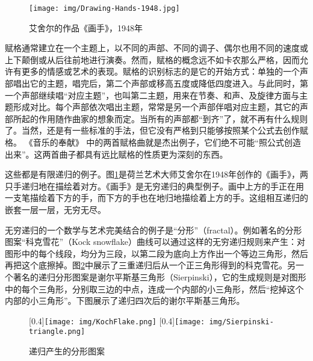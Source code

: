\documentclass[UTF8]{article}
\begin{document}
\begin{figure}[htbp]
 \centering
 \texttt{[image: img/Drawing-Hands-1948.jpg]}
 \caption{艾舍尔的作品《画手》，1948年}
 \label{fig:Drawing-Hands}
\end{figure}

赋格通常建立在一个主题上，以不同的声部、不同的调子、偶尔也用不同的速度或上下颠倒或从后往前地进行演奏。然而，赋格的概念远不如卡农那么严格，因而允许有更多的情感或艺术的表现。赋格的识别标志的是它的开始方式：单独的一个声部唱出它的主题，唱完后，第二个声部或移高五度或降低四度进入。与此同时，第一个声部继续唱“对应主题”，也叫第二主题，用来在节奏、和声、及旋律方面与主题形成对比。每个声部依次唱出主题，常常是另一个声部伴唱对应主题，其它的声部所起的作用随作曲家的想象而定。当所有的声部都“到齐”了，就不再有什么规则了。当然，还是有一些标准的手法，但它没有严格到只能够按照某个公式去创作赋格。 《音乐的奉献》 中的两首赋格曲就是杰出例子，它们绝不可能“照公式创造出来”。这两首曲子都具有远比赋格的性质更为深刻的东西\cite{GEB}。

这些都是有限递归的例子。图\ref{fig:Drawing-Hands}是荷兰艺术大师艾舍尔在1948年创作的《画手》，两只手递归地在描绘着对方。《画手》是无穷递归的典型例子。画中上方的手正在用一支笔描绘着下方的手，而下方的手也在地归地描绘着上方的手。这组相互递归的嵌套一层一层，无穷无尽。

无穷递归的一个数学与艺术完美结合的例子是“分形”（fractal）。例如著名的分形图案“科克雪花”（Kock snowflake）曲线可以通过这样的无穷递归规则来产生：对图形中的每个线段，均分为三段，以第二段为底向上方作出一个等边三角形，然后再把这个底擦掉。图\ref{fig:fractal}中展示了三重递归后从一个正三角形得到的科克雪花。另一个著名的递归分形图案是谢尔平斯基三角形（Sierpinski），它的生成规则是对图形中的每个三角形，分别取三边的中点，连成一个内部的小三角形，然后“挖掉这个内部的小三角形”。下图展示了递归四次后的谢尔平斯基三角形。

\begin{figure}[htbp]
 \centering
 [0.4\linewidth]{\texttt{[image: img/KochFlake.png]}}
 [0.4\linewidth]{\texttt{[image: img/Sierpinski-triangle.png]}}
 \caption{递归产生的分形图案}
 \label{fig:fractal}
\end{figure}
\end{document}
